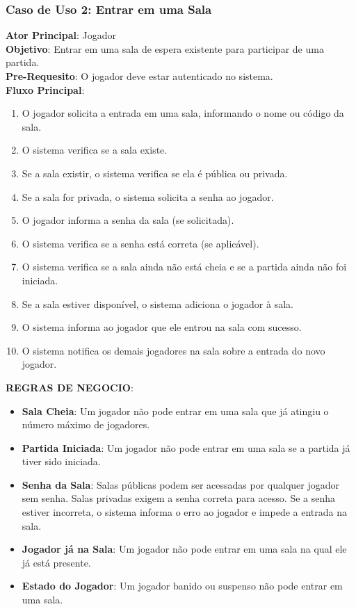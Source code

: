 \subsubsection{Caso de Uso 2: Entrar em uma Sala}
    \textbf{Ator Principal}: Jogador \\
    \textbf{Objetivo}: Entrar em uma sala de espera existente para participar de uma partida. \\
    \textbf{Pre-Requesito}: O jogador deve estar autenticado no sistema. \\
    \textbf{Fluxo Principal}: \\
    \begin{enumerate}
        \item O jogador solicita a entrada em uma sala, informando o nome ou código da sala.
        \item O sistema verifica se a sala existe.
        \item Se a sala existir, o sistema verifica se ela é pública ou privada.
        \item Se a sala for privada, o sistema solicita a senha ao jogador.
        \item O jogador informa a senha da sala (se solicitada).
        \item O sistema verifica se a senha está correta (se aplicável).
        \item O sistema verifica se a sala ainda não está cheia e se a partida ainda não foi iniciada.
        \item Se a sala estiver disponível, o sistema adiciona o jogador à sala.
        \item O sistema informa ao jogador que ele entrou na sala com sucesso.
        \item O sistema notifica os demais jogadores na sala sobre a entrada do novo jogador.
    \end{enumerate}

    \textbf{REGRAS DE NEGOCIO}:
    \begin{itemize}
        \item \textbf{Sala Cheia}: Um jogador não pode entrar em uma sala que já atingiu o número máximo de jogadores.
        \item \textbf{Partida Iniciada}: Um jogador não pode entrar em uma sala se a partida já tiver sido iniciada.
        \item \textbf{Senha da Sala}:
            \subitem Salas públicas podem ser acessadas por qualquer jogador sem senha.
            \subitem Salas privadas exigem a senha correta para acesso.
            \subitem Se a senha estiver incorreta, o sistema informa o erro ao jogador e impede a entrada na sala.
        \item \textbf{Jogador já na Sala}: Um jogador não pode entrar em uma sala na qual ele já está presente.
        \item \textbf{Estado do Jogador}:  Um jogador banido ou suspenso não pode entrar em uma sala. 
    \end{itemize}